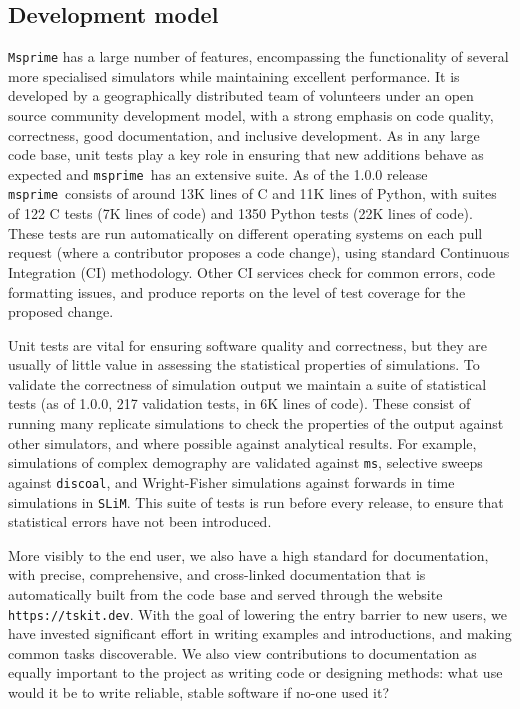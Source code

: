 \documentclass{article}
\newcommand{\msprime}[0]{\texttt{msprime}}
\newcommand{\ms}[0]{\texttt{ms}}
\newcommand{\SLiM}[0]{\texttt{SLiM}}
\newcommand{\discoal}[0]{\texttt{discoal}}
\begin{document}
\subsection*{Development model}
\texttt{Msprime} has a large number of features, encompassing
the functionality of several more specialised simulators
while maintaining excellent performance.
It is developed by a geographically distributed team of volunteers under an
open source community development model, with a strong emphasis
on code quality, correctness, good documentation, and inclusive development.
As in any large code base,
unit tests play a key role in ensuring that new additions behave
as expected and \msprime\ has an extensive suite.
As of the 1.0.0 release \msprime\ consists of around 13K lines of C and 11K
lines of Python, with suites of 122 C tests (7K lines of code) and
1350 Python tests (22K lines of code). These tests are run
automatically on different operating systems on each pull request
(where a contributor proposes a code change), using standard Continuous
Integration (CI) methodology. Other CI services
check for common errors, code formatting issues, and produce reports on
the level of test coverage for the proposed change.

Unit tests are vital for ensuring software quality and correctness, but
they are usually of little value in assessing the statistical properties
of simulations. To validate the correctness of simulation output
we maintain a suite of statistical tests (as of 1.0.0,
217 validation tests, in 6K lines of code). These consist of running many
replicate simulations to check the properties of the output
against other simulators, and where possible against analytical results.
For example, simulations of complex demography are validated against \ms,
selective sweeps against \discoal, and Wright-Fisher simulations
against forwards in time simulations in \SLiM.
This suite of tests is run before every release, to ensure
that statistical errors have not been introduced.

More visibly to the end user, we also have a high standard for documentation,
with precise, comprehensive, and cross-linked documentation
that is automatically built from the code base
and served through the website \texttt{https://tskit.dev}.
With the goal of lowering the entry barrier to new users,
we have invested significant effort in writing examples and introductions,
and making common tasks discoverable.
We also view contributions to documentation as equally important to the project
as writing code or designing methods: what use would it be
to write reliable, stable software if no-one used it?
\end{document}
